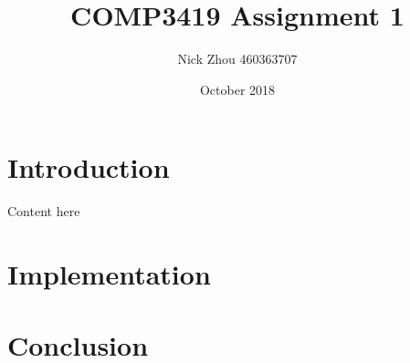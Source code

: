 \documentclass[12pt,a4paper]{article}
\begin{document}
    \begin{titlepage}
        \title{COMP3419 Assignment 1}
        \author{Nick Zhou 460363707}
        \date{October 2018}
        \maketitle
    \end{titlepage}

    \begin{tableofcontents}
        \tableofcontents
        \pagebreak
    \end{tableofcontents}

    \section{Introduction}
        Content here

    \section{Implementation}

    \section{Conclusion}
\end{document}
